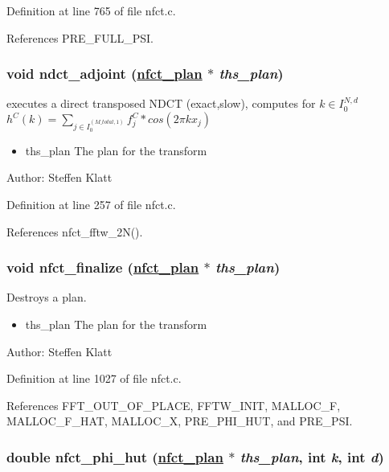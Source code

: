 Definition at line 765 of file nfct.c.

References PRE\_\-FULL\_\-PSI.\hypertarget{group__nfsct_ga9}{
\subsubsection[ndct\_\-adjoint]{\setlength{\rightskip}{0pt plus 5cm}void ndct\_\-adjoint (\hyperlink{structnfct__plan}{nfct\_\-plan} $\ast$ {\em ths\_\-plan})}}
\label{group__nfsct_ga9}


executes a direct transposed NDCT (exact,slow), computes for $k \in I_0^{N,d}$ $h^C(k) = \sum_{j \in I_0^{(M\_total,1)}} f_j^C * cos(2 \pi k x_j)$ 

\begin{itemize}
\item ths\_\-plan The plan for the transform\end{itemize}
\begin{Desc}
\item[Author:]Steffen Klatt \end{Desc}


Definition at line 257 of file nfct.c.

References nfct\_\-fftw\_\-2N().\hypertarget{group__nfsct_ga10}{
\subsubsection[nfct\_\-finalize]{\setlength{\rightskip}{0pt plus 5cm}void nfct\_\-finalize (\hyperlink{structnfct__plan}{nfct\_\-plan} $\ast$ {\em ths\_\-plan})}}
\label{group__nfsct_ga10}


Destroys a plan. 

\begin{itemize}
\item ths\_\-plan The plan for the transform\end{itemize}
\begin{Desc}
\item[Author:]Steffen Klatt \end{Desc}


Definition at line 1027 of file nfct.c.

References FFT\_\-OUT\_\-OF\_\-PLACE, FFTW\_\-INIT, MALLOC\_\-F, MALLOC\_\-F\_\-HAT, MALLOC\_\-X, PRE\_\-PHI\_\-HUT, and PRE\_\-PSI.\hypertarget{group__nfsct_ga11}{
\subsubsection[nfct\_\-phi\_\-hut]{\setlength{\rightskip}{0pt plus 5cm}double nfct\_\-phi\_\-hut (\hyperlink{structnfct__plan}{nfct\_\-plan} $\ast$ {\em ths\_\-plan}, int {\em k}, int {\em d})}}
\label{group__nfsct_ga11}


